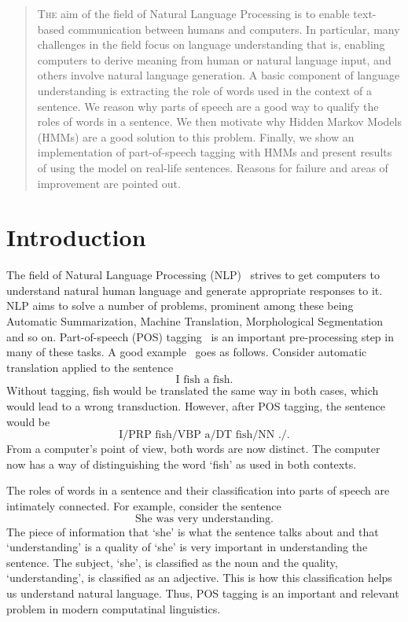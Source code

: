 \documentclass[11pt]{article}
\begin{document}
\maketitle

\begin{abstract}
\lettrine[lines=2]{T}{he} aim of the field of Natural Language Processing is to enable text-based communication between humans and computers. In particular, many challenges in the field focus on language understanding that is, enabling computers to derive meaning from human or natural language input, and others involve natural language generation. A basic component of language understanding is extracting the role of words used in the context of a sentence. We reason why parts of speech are a good way to qualify the roles of words in a sentence. We then motivate why Hidden Markov Models (HMMs) are a good solution to this problem. Finally, we show an implementation of part-of-speech tagging with HMMs and present results of using the model on real-life sentences. Reasons for failure and areas of improvement are pointed out.
\end{abstract}

\section{Introduction}
The field of Natural Language Processing (NLP)~\cite{wiki:nlp} strives to get computers to understand natural human language and generate appropriate responses to it. NLP aims to solve a number of problems, prominent among these being Automatic Summarization, Machine Translation, Morphological Segmentation and so on. Part-of-speech (POS) tagging~\cite{wiki:pos} is an important pre-processing step in many of these tasks. A good example~\cite{so:uses} goes as follows. Consider automatic translation applied to the sentence
%
$$\text{I fish a fish.}$$
%
Without tagging, fish would be translated the same way in both cases, which would lead to a wrong transduction. However, after POS tagging, the sentence would be
%
$$\text{I/PRP fish/VBP a/DT fish/NN ./.}$$
%
From a computer's point of view, both words are now distinct. The computer now has a way of distinguishing the word `fish' as used in both contexts.

The roles of words in a sentence and their classification into parts of speech are intimately connected. For example, consider the sentence
%
$$\text{She was very understanding.}$$
%
The piece of information that `she' is what the sentence talks about and that `understanding' is a quality of `she' is very important in understanding the sentence. The subject, `she', is classified as the noun and the quality, `understanding', is classified as an adjective. This is how this classification helps us understand natural language. Thus, POS tagging is an important and relevant problem in modern computatinal linguistics.
\end{document}
